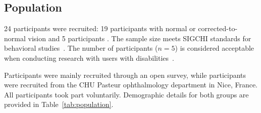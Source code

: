\subsection{Population}
\label{sec:population-and-results}

24 participants were recruited: 19 participants with normal or corrected-to-normal vision and 5 participants \LV. The sample size meets SIGCHI standards for behavioral studies~\cite{caine-2016}. The number of participants \LV ($n=5$) is considered acceptable when conducting research with users with disabilities~\cite{lazar-hci-2017}.

 Participants \NV were mainly recruited through an open survey, while participants \LV were recruited from the CHU Pasteur ophthalmology department in Nice, France. All participants took part voluntarily. Demographic details for both groups are provided in Table~\ref{tab:population}.

